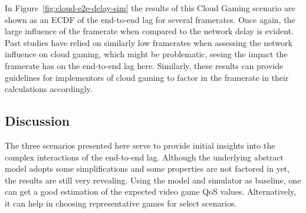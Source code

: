 In Figure~\ref{fig:cloud-e2e-delay-sim} the results of this Cloud Gaming scenario are shown as an \gls{ECDF} of the end-to-end lag for several framerates. Once again, the large influence of the framerate when compared to the network delay is evident. Past studies have relied on similarly low framerates when assessing the network influence on cloud gaming, which might be problematic, seeing the impact the framerate has on the end-to-end lag here. 
Similarly, these results can provide guidelines for implementors of cloud gaming to factor in the framerate in their calculations accordingly.


\subsection{Discussion}

The three scenarios presented here serve to provide initial insights into the complex interactions of the end-to-end lag. Although the underlying abstract model adopts some simplifications and some properties are not factored in yet, the results are still very revealing.
Using the model and simulator as baseline, one can get a good estimation of the expected video game \gls{QoS} values. Alternatively, it can help in choosing representative games for select scenarios.







